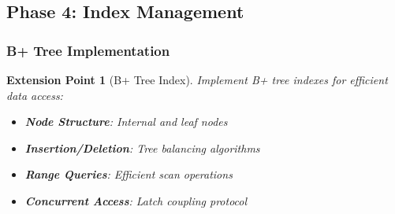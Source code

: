 \documentclass[12pt,a4paper]{article}
\newtheorem{extension}{Extension Point}[section]
\begin{document}
\subsection{Phase 4: Index Management}

\subsubsection{B+ Tree Implementation}

\begin{extension}[B+ Tree Index]
Implement B+ tree indexes for efficient data access:

\begin{itemize}
    \item \textbf{Node Structure}: Internal and leaf nodes
    \item \textbf{Insertion/Deletion}: Tree balancing algorithms
    \item \textbf{Range Queries}: Efficient scan operations
    \item \textbf{Concurrent Access}: Latch coupling protocol
\end{itemize}
\end{extension}
\end{document}
